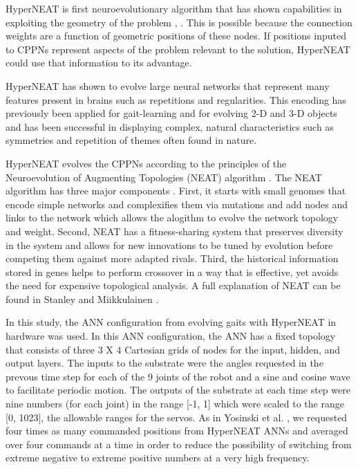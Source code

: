 HyperNEAT is first neuroevolutionary algorithm that has shown capabilities in exploiting the geometry of the problem \cite{stanley2009hypercube}, \cite{clune2009sensitivity}.
This is possible because the connection weights are a function of geometric positions of these nodes. 
If positions inputed to CPPNs represent aspects of the problem relevant to the solution, HyperNEAT could use that information to its advantage.  

HyperNEAT has shown to evolve large neural networks that represent many features present in brains such as repetitions and regularities. 
This encoding has previously been applied for gait-learning \cite{yos:clune} and for evolving 2-D and 3-D objects \cite{clune:lipson20113d} and has been successful in displaying complex, natural characteristics such as symmetries and repetition of themes often found in nature.


HyperNEAT evolves the CPPNs according to the principles of the Neuroevolution of Augmenting Topologies (NEAT) algorithm \cite{stanley2006exploiting}. 
The NEAT algorithm has three major components \cite{stanley2006exploiting}. 
First, it starts with small genomes that encode simple networks and complexifies them via mutations and add nodes and links to the network which allows the alogithm to evolve the network topology and weight. 
Second, NEAT has a fitness-sharing system that preserves diversity in the system and allows for new innovations to be tuned by evolution before competing them against more adapted rivals. 
Third, the historical information stored in genes helps to perform crossover in a way that is effective, yet avoids the need for expensive topological analysis. A full explanation of NEAT can be found in Stanley and Miikkulainen \cite{stanley2006exploiting}. 


In this study, the ANN configuration from evolving gaits with HyperNEAT in hardware \cite{yos:clune} was used. 
In this ANN configuration, the ANN has a fixed topology that consists of three 3 X 4 Cartesian grids of nodes for the input, hidden, and output layers. 
The inputs to the substrate were the angles requested in the prevous time step for each of the 9 joints of the robot and a sine and cosine wave to facilitate periodic motion. 
The outputs of the substrate at each time step were nine numbers (for each joint) in the range [-1, 1] which were scaled to the range [0, 1023], the allowable ranges for the servos. 
As in Yosinski et al. \cite{yos:clune}, we requested four times as many commanded positions from HyperNEAT ANNs and averaged over four commands at a time in order to reduce the possibility of switching from extreme negative to extreme positive numbers at a very high frequency. 

